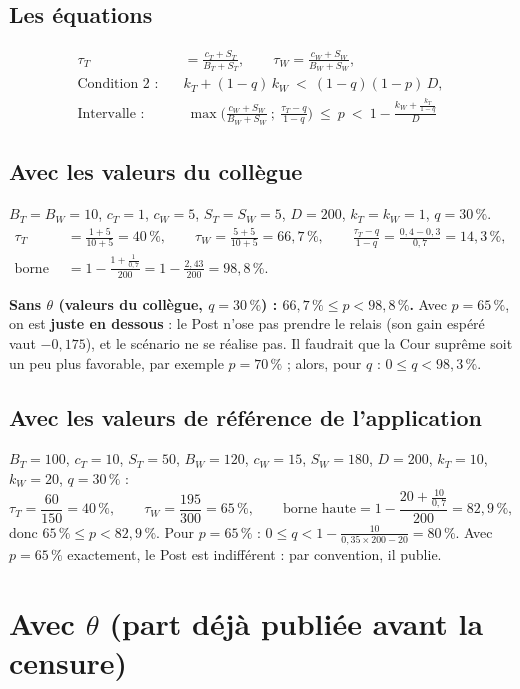 \documentclass[11pt,a4paper]{article}
\theoremstyle{definition}
\begin{document}
\subsection{Les équations}
\begin{align*}
\tau_T &= \frac{c_T+S_T}{B_T+S_T}, \qquad \tau_W=\frac{c_W+S_W}{B_W+S_W},\\[4pt]
\text{Condition 2 :}\quad & k_T+(1-q)\,k_W\ <\ (1-q)(1-p)\,D,\\[4pt]
\boxed{\text{Intervalle :}}\quad & \boxed{\ \max\!\Big(\frac{c_W+S_W}{B_W+S_W}\ ;\ \frac{\tau_T-q}{1-q}\Big)\ \le\ p\ <\ 1-\frac{k_W+\frac{k_T}{1-q}}{D}\ }
\end{align*}

\subsection{Avec les valeurs du collègue}
$B_T=B_W=10$, $c_T=1$, $c_W=5$, $S_T=S_W=5$, $D=200$, $k_T=k_W=1$, $q=30\,\%$.
\begin{align*}
\tau_T &= \frac{1+5}{10+5}=40\,\%, \qquad \tau_W=\frac{5+5}{10+5}=66,7\,\%, \qquad \frac{\tau_T-q}{1-q}=\frac{0,4-0,3}{0,7}=14,3\,\%,\\[4pt]
\text{borne haute} &= 1-\frac{1+\frac{1}{0,7}}{200}=1-\frac{2,43}{200}=98,8\,\%.
\end{align*}
\begin{reponse}
\textbf{Sans $\theta$ (valeurs du collègue, $q=30\,\%$) : $66,7\,\%\le p<98,8\,\%$.} Avec $p=65\,\%$, on est \textbf{juste en dessous} : le Post n'ose pas prendre le relais (son gain espéré vaut $-0,175$), et le scénario ne se réalise pas. Il faudrait que la Cour suprême soit un peu plus favorable, par exemple $p=70\,\%$ ; alors, pour $q$ : $0\le q<98,3\,\%$.
\end{reponse}

\subsection{Avec les valeurs de référence de l'application}
$B_T=100$, $c_T=10$, $S_T=50$, $B_W=120$, $c_W=15$, $S_W=180$, $D=200$, $k_T=10$, $k_W=20$, $q=30\,\%$ :
\[
\tau_T=\frac{60}{150}=40\,\%,\qquad \tau_W=\frac{195}{300}=65\,\%,\qquad \text{borne haute}=1-\frac{20+\frac{10}{0,7}}{200}=82,9\,\%,
\]
donc $65\,\%\le p<82,9\,\%$.
Pour $p=65\,\%$ : $0\le q<1-\frac{10}{0,35\times200-20}=80\,\%$. Avec $p=65\,\%$ exactement, le Post est indifférent : par convention, il publie.

\section{Avec \texorpdfstring{$\theta$}{theta} (part déjà publiée avant la censure)}
\end{document}
